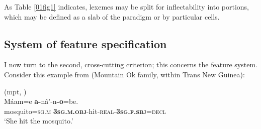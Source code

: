 \documentclass[output=paper,colorlinks,citecolor=brown]{langscibook}
\begin{document}
As Table \ref{01fig1} indicates, lexemes may be split for inflectability into portions, which may be defined as a slab of the paradigm or by particular cells.

\subsection{System of feature specification} \label{01sec4.2}

I now turn to the second, cross-cutting criterion; this concerns the feature system. Consider this example from  (Mountain Ok family, within Trans New Guinea):

\begin{exe}
	\ex {} (mpt, \citealt[284]{fedden2022}) \label{01ex9} \\
	\gll Máam=e	\textbf{a-}nâ’-n\textbf{-o}=be.	 \\
	mosquito=\textsc{sg.m} \textbf{\textsc{3sg.m.obj}}-hit-\textsc{real-\textbf{3sg.f.sbj}=decl} \\
	\trans ‘She hit the mosquito.’
\end{exe}
\end{document}
